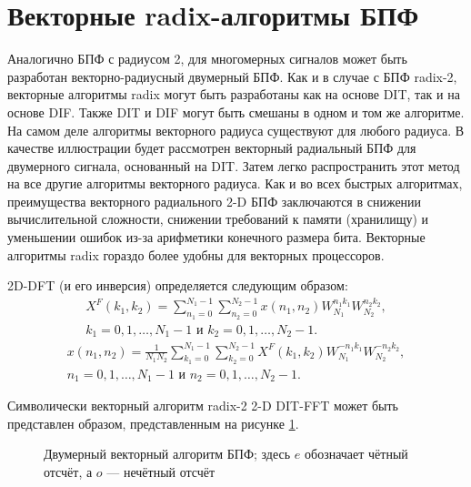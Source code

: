 \section{Векторные radix-алгоритмы БПФ}
Аналогично БПФ с радиусом 2, для многомерных сигналов может быть разработан векторно-радиусный двумерный БПФ.
Как и в случае с БПФ radix-2, векторные алгоритмы radix могут быть разработаны как на основе DIT, так и на основе DIF.
Также DIT и DIF могут быть смешаны в одном и том же алгоритме.
На самом деле алгоритмы векторного радиуса существуют для любого радиуса.
В качестве иллюстрации будет рассмотрен векторный радиальный БПФ для двумерного сигнала, основанный на DIT.
Затем легко распространить этот метод на все другие алгоритмы векторного радиуса.
Как и во всех быстрых алгоритмах, преимущества векторного радиального 2-D БПФ заключаются в снижении вычислительной сложности, снижении требований к памяти (хранилищу) и уменьшении ошибок из-за арифметики конечного размера бита.
Векторные алгоритмы radix гораздо более удобны для векторных процессоров.

2D-DFT (и его инверсия) определяется следующим образом:
\begin{equation}\label{eq: 2d fft fwd}\begin{gathered}
X^F(k_1, k_2) = \sum_{n_1=0}^{N_1-1} \sum_{n_2=0}^{N_2-1} x(n_1, n_2) W_{N_1}^{n_1 k_1} W_{N_2}^{n_2 k_2}, \\
k_1 = 0, 1, \dots, N_1 - 1 \text{ и } k_2 = 0, 1, \dots, N_2 - 1.
\end{gathered}\end{equation}
\begin{equation}\label{eq: 2d fft inv}\begin{gathered}
x(n_1, n_2) = \frac{1}{N_1 N_2} \sum_{k_1=0}^{N_1-1} \sum_{k_2=0}^{N_2-1} X^F(k_1, k_2) W_{N_1}^{-n_1 k_1} W_{N_2}^{-n_2 k_2}, \\
n_1 = 0, 1, \dots, N_1 - 1 \text{ и } n_2 = 0, 1, \dots, N_2 - 1.
\end{gathered}\end{equation}

Символически векторный алгоритм radix-2 2-D DIT-FFT может быть представлен образом, представленным на рисунке \ref{figure: 2d vector fft}.
\begin{figure}
\centering
{}
\caption{Двумерный векторный алгоритм БПФ; здесь $e$ обозначает чётный отсчёт, а $o$ --- нечётный отсчёт}
\label{figure: 2d vector fft}
\end{figure}

